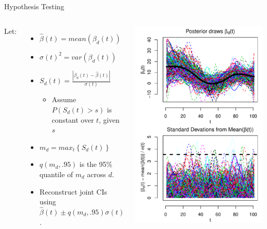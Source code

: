 \documentclass[9 pt]{beamer}
\newcommand{\bi}{\begin{itemize}}
\newcommand{\ei}{\end{itemize}}
\newcommand{\ilist}[1]{\bi \item #1 \ei}
\begin{document}
\begin{frame}{Hypothesis Testing}

\begin{columns}[c]

Let:
\bi
\item $\hat{\beta}(t)=mean(\beta_d(t))$
\item $\sigma(t)^2 = var(\beta_d(t))$
\item $S_d(t) = \frac{|\beta_d(t)-\hat{\beta}(t)    | } {\sigma(t)}$
\ilist{Assume $P(S_d(t)>s)$ is constant over $t$, given $s$}
\item $m_d= max_t \left\lbrace S_d(t) \right\rbrace$
\item $q(m_d,.95)$ is the 95\% quantile of $m_d$ across $d$.
\item Reconstruct joint CIs using $\hat{\beta}(t) \pm  q(m_d,.95)\sigma(t)$.
\ei

\includegraphics[scale=.4]{pics/Figure_Get_d_dist.pdf}
\end{columns}

\end{frame}
\end{document}
